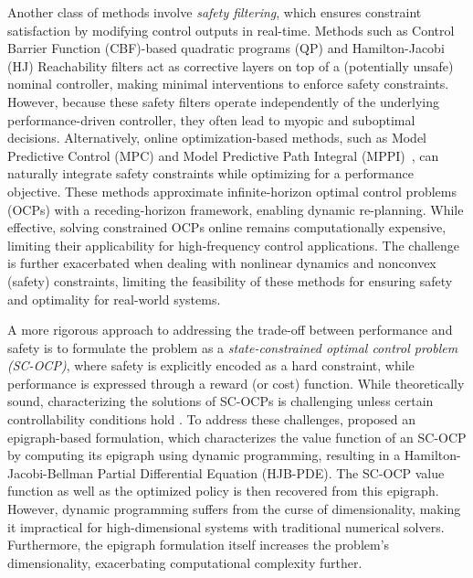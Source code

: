 Another class of methods involve \textit{safety filtering}, which ensures constraint satisfaction by modifying control outputs in real-time. 
Methods such as Control Barrier Function (CBF)-based quadratic programs (QP) \cite{Ames_2017} and Hamilton-Jacobi (HJ) Reachability filters \cite{10665911, 10266799} act as corrective layers on top of a (potentially unsafe) nominal controller, making minimal interventions to enforce safety constraints. 
However, because these safety filters operate independently of the underlying performance-driven controller, they often lead to myopic and suboptimal decisions.
Alternatively, online optimization-based methods, such as Model Predictive Control (MPC) \cite{GARCIA1989335, grune2017nonlinear} and Model Predictive Path Integral (MPPI)~\cite{8558663, 10161511}, can naturally integrate safety constraints while optimizing for a performance objective.
These methods approximate infinite-horizon optimal control problems (OCPs) with a receding-horizon framework, enabling dynamic re-planning. 
While effective, solving constrained OCPs online remains computationally expensive, limiting their applicability for high-frequency control applications. The challenge is further exacerbated when dealing with nonlinear dynamics and nonconvex (safety) constraints, limiting the feasibility of these methods for ensuring safety and optimality for real-world systems.

A more rigorous approach to addressing the trade-off between performance and safety is to formulate the problem as a \textit{state-constrained optimal control problem (SC-OCP)}, where safety is explicitly encoded as a hard constraint, while performance is expressed through a reward (or cost) function.
While theoretically sound, characterizing the solutions of SC-OCPs is challenging unless certain controllability conditions hold \cite{doi:10.1137/0324032}. 
To address these challenges, \cite{altarovici2013general} proposed an epigraph-based formulation, which characterizes the value function of an SC-OCP by computing its epigraph using dynamic programming, resulting in a Hamilton-Jacobi-Bellman Partial Differential Equation (HJB-PDE).
The SC-OCP value function as well as the optimized policy is then recovered from this epigraph.
However, dynamic programming suffers from the curse of dimensionality, making it impractical for high-dimensional systems with traditional numerical solvers. 
Furthermore, the epigraph formulation itself increases the problem's dimensionality, exacerbating computational complexity further.

